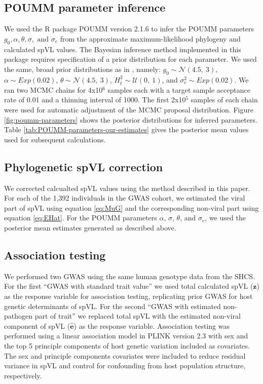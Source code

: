 \documentclass[]{article}
\begin{document}
\begin{doublespace}
\subsection{POUMM parameter inference}

We used the R package POUMM version 2.1.6 \citep{Mitov2017a-POUMM} to infer the POUMM parameters $g_0, \alpha, \theta, \sigma, \text{ and }\sigma_e$ from the approximate maximum-likelihood phylogeny and calculated spVL values. The Bayesian inference method implemented in this package requires specification of a prior distribution for each parameter. We used the same, broad prior distributions as in \citet{Mitov2018}, namely: $g_{0} \sim \mathcal{N}(4.5,\ 3)$, $\alpha \sim Exp(0.02)$, $\theta \sim \mathcal{N}(4.5,\ 3)$, $H^2_{\bar{t}} \sim \mathcal{U}(0,\ 1)$, and $\sigma^2_e \sim Exp(0.02)$. We ran two MCMC chains for 4x10$^6$ samples each with a target sample acceptance rate of 0.01 and a thinning interval of 1000. The first 2x10$^5$ samples of each chain were used for automatic adjustment of the MCMC proposal distribution. Figure \ref{fig:poumm-parameters} shows the posterior distributions for inferred parameters. Table \ref{tab:POUMM-parameters-our-estimates} gives the posterior mean values used for subsequent calculations.

\subsection{Phylogenetic spVL correction}
We corrected calcualted spVL values using the method described in this paper. For each of the 1,392 individuals in the GWAS cohort, we estimated the viral part of spVL using equation \ref{eq:MuG} and the corresponding non-viral part using equation \ref{eq:EHat}. For the POUMM parameters $\alpha$, $\sigma$, $\theta$, and $\sigma_e$, we used the posterior mean estimates generated as described above. 

\subsection{Association testing}
We performed two GWAS using the same human genotype data from the SHCS. For the first ``GWAS with standard trait value'' we used total calculated spVL ($\bm{z}$) as the response variable for association testing, replicating prior GWAS for host genetic determinants of spVL. For the second ``GWAS with estimated non-pathogen part of trait'' we replaced total spVL with the estimated non-viral component of spVL ($\hat{\bm{e}}$) as the response variable. Association testing was performed using a linear association model in PLINK version 2.3 \citep{Chang2015} with sex and the top 5 principle components of host genetic variation included as covariates. The sex and principle components covariates were included to reduce residual variance in spVL and control for confounding from host population structure, respectively. 


\end{doublespace}
\end{document}
